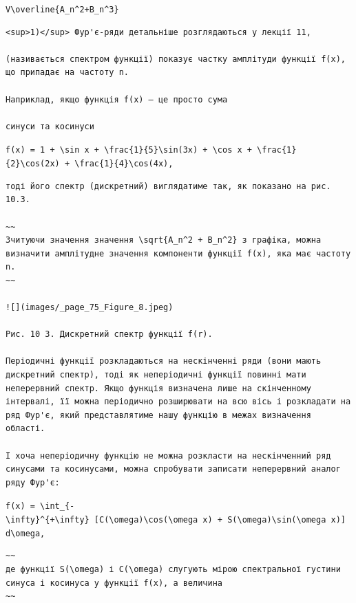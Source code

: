 \documentclass[
  ukrainian,
]{article}
\begin{document}
\texttt{V\textbackslash{}overline\{A\_n\^{}2+B\_n\^{}3\}}

\begin{verbatim}
<sup>1)</sup> Фур'є-ряди детальніше розглядаються у лекції 11,

(називається спектром функції) показує частку амплітуди функції f(x), що припадає на частоту n.

Наприклад, якщо функція f(x) — це просто сума

синуси та косинуси
\end{verbatim}

\texttt{f(x)\ =\ 1\ +\ \textbackslash{}sin\ x\ +\ \textbackslash{}frac\{1\}\{5\}\textbackslash{}sin(3x)\ +\ \textbackslash{}cos\ x\ +\ \textbackslash{}frac\{1\}\{2\}\textbackslash{}cos(2x)\ +\ \textbackslash{}frac\{1\}\{4\}\textbackslash{}cos(4x),}

\begin{verbatim}
тоді його спектр (дискретний) виглядатиме так, як показано на рис. 10.3.

~~
Зчитуючи значення значення \sqrt{A_n^2 + B_n^2} з графіка, можна визначити амплітудне значення компоненти функції f(x), яка має частоту n.
~~

![](images/_page_75_Figure_8.jpeg)

Рис. 10 3. Дискретний спектр функції f(r).

Періодичні функції розкладаються на нескінченні ряди (вони мають дискретний спектр), тоді як неперіодичні функції повинні мати неперервний спектр. Якщо функція визначена лише на скінченному інтервалі, її можна періодично розширювати на всю вісь і розкладати на ряд Фур'є, який представлятиме нашу функцію в межах визначення області.

І хоча неперіодичну функцію не можна розкласти на нескінченний ряд синусами та косинусами, можна спробувати записати неперервний аналог ряду Фур'є:
\end{verbatim}

\texttt{f(x)\ =\ \textbackslash{}int\_\{-\textbackslash{}infty\}\^{}\{+\textbackslash{}infty\}\ {[}C(\textbackslash{}omega)\textbackslash{}cos(\textbackslash{}omega\ x)\ +\ S(\textbackslash{}omega)\textbackslash{}sin(\textbackslash{}omega\ x){]}\ d\textbackslash{}omega,}

\begin{verbatim}
~~
де функції S(\omega) і C(\omega) слугують мірою спектральної густини синуса і косинуса у функції f(x), а величина
~~
\end{verbatim}
\end{document}
